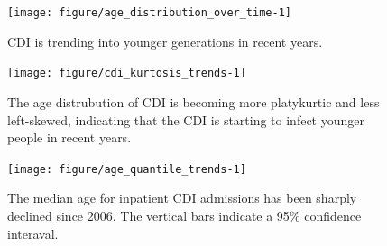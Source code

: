 \documentclass[12pt]{ociamthesis}\usepackage[]{graphicx}\usepackage[]{color}
\newenvironment{knitrout}{}{} %
\begin{document}
\begin{knitrout}
\color{fgcolor}\begin{figure}

{\centering \texttt{[image: figure/age\_distribution\_over\_time-1]} 

}

\caption[CDI is trending into younger generations in recent years]{CDI is trending into younger generations in recent years.}\label{fig:age_distribution_over_time}
\end{figure}


\end{knitrout}
\label{fig:age_distribution_over_time}

\begin{knitrout}
\color{fgcolor}\begin{figure}

{\centering \texttt{[image: figure/cdi\_kurtosis\_trends-1]} 

}

\caption[The age distrubution of CDI is becoming more platykurtic and less left-skewed, indicating that the CDI is starting to infect younger people in recent years]{The age distrubution of CDI is becoming more platykurtic and less left-skewed, indicating that the CDI is starting to infect younger people in recent years. }\label{fig:cdi_kurtosis_trends}
\end{figure}


\end{knitrout}
\label{fig:cdi_kurtosis_trends}

\begin{knitrout}
\color{fgcolor}\begin{figure}

{\centering \texttt{[image: figure/age\_quantile\_trends-1]} 

}

\caption[The median age for inpatient CDI admissions has been sharply declined since 2006]{The median age for inpatient CDI admissions has been sharply declined since 2006. The vertical bars indicate a 95\% confidence interaval.}\label{fig:age_quantile_trends}
\end{figure}


\end{knitrout}

\label{fig:age_quantile_trends}
\end{document}
